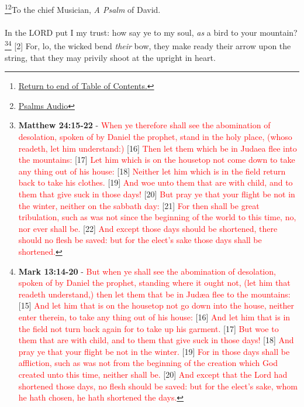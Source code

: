 \footnote{\textcolor[cmyk]{0.99998,1,0,0}{\hyperlink{TOC}{Return to end of Table of Contents.}}}\footnote{\href{https://audiobible.com/bible}{\textcolor[cmyk]{0.99998,1,0,0}{Psalms Audio}}}\textcolor[cmyk]{0.99998,1,0,0}{To the chief Musician, \emph{A Psalm} of David.}\\
\\
\textcolor[cmyk]{0.99998,1,0,0}{In the LORD put I my trust: how say ye to my soul,  \emph{as} a bird to your mountain?}\footnote{\textbf{Matthew 24:15-22} - \textcolor{red}{When ye therefore shall see the abomination of desolation, spoken of by Daniel the prophet, stand in the holy place, (whoso readeth, let him understand:)} [16] \textcolor{red}{Then let them which be in Judaea flee into the mountains:} [17] \textcolor{red}{Let him which is on the housetop not come down to take any thing out of his house:} [18] \textcolor{red}{Neither let him which is in the field return back to take his clothes.} [19] \textcolor{red}{And woe unto them that are with child, and to them that give suck in those days!} [20] \textcolor{red}{But pray ye that your flight be not in the winter, neither on the sabbath day:} [21] \textcolor{red}{For then shall be great tribulation, such as was not since the beginning of the world to this time, no, nor ever shall be.} [22] \textcolor{red}{And except those days should be shortened, there should no flesh be saved: but for the elect’s sake those days shall be shortened.}}\footnote{\textbf{Mark 13:14-20} - \textcolor{red}{But when ye shall see the abomination of desolation, spoken of by Daniel the prophet, standing where it ought not, (let him that readeth understand,) then let them that be in Judæa flee to the mountains:} [15] \textcolor{red}{And let him that is on the housetop not go down into the house, neither enter therein, to take any thing out of his house:} [16] \textcolor{red}{And let him that is in the field not turn back again for to take up his garment.} [17] \textcolor{red}{But woe to them that are with child, and to them that give suck in those days!} [18] \textcolor{red}{And pray ye that your flight be not in the winter.} [19] \textcolor{red}{For in those days shall be affliction, such as was not from the beginning of the creation which God created unto this time, neither shall be.} [20] \textcolor{red}{And except that the Lord had shortened those days, no flesh should be saved: but for the elect’s sake, whom he hath chosen, he hath shortened the days.}}
[2] \textcolor[cmyk]{0.99998,1,0,0}{For, lo, the wicked bend \emph{their} bow, they make ready their arrow upon the string, that they may privily shoot at the upright in heart.}

